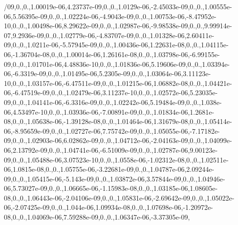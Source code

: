 \begin{DoxyCompactItemize}
/09,0.,0.,1.\-00019e-\/06,4.\-23737e-\/09,0.,0.,1.\-0129e-\/06,-\/2.\-45033e-\/09,0.,0.,1.\-00555e-\/06,5.\-56395e-\/09,0.,0.,1.\-02224e-\/06,-\/4.\-9043e-\/09,0.,0.,1.\-00753e-\/06,-\/8.\-47952e-\/10,0.,0.,1.\-00498e-\/06,8.\-29622e-\/09,0.,0.,1.\-02987e-\/06,-\/9.\-98538e-\/09,0.,0.,9.\-99914e-\/07,9.\-2936e-\/09,0.,0.,1.\-02779e-\/06,-\/4.\-83707e-\/09,0.,0.,1.\-01328e-\/06,2.\-60411e-\/09,0.,0.,1.\-0211e-\/06,-\/5.\-57945e-\/09,0.,0.,1.\-00436e-\/06,1.\-22631e-\/08,0.,0.,1.\-04115e-\/06,-\/1.\-36704e-\/08,0.,0.,1.\-00014e-\/06,1.\-26161e-\/08,0.,0.,1.\-03798e-\/06,-\/6.\-99155e-\/09,0.,0.,1.\-01701e-\/06,4.\-48836e-\/10,0.,0.,1.\-01836e-\/06,5.\-19606e-\/09,0.,0.,1.\-03394e-\/06,-\/6.\-3319e-\/09,0.,0.,1.\-01495e-\/06,5.\-2305e-\/09,0.,0.,1.\-03064e-\/06,3.\-11123e-\/10,0.,0.,1.\-03157e-\/06,-\/6.\-47511e-\/09,0.,0.,1.\-01215e-\/06,1.\-06882e-\/08,0.,0.,1.\-04421e-\/06,-\/6.\-47519e-\/09,0.,0.,1.\-02479e-\/06,3.\-11237e-\/10,0.,0.,1.\-02572e-\/06,5.\-23035e-\/09,0.,0.,1.\-04141e-\/06,-\/6.\-3316e-\/09,0.,0.,1.\-02242e-\/06,5.\-19484e-\/09,0.,0.,1.\-038e-\/06,4.\-53497e-\/10,0.,0.,1.\-03936e-\/06,-\/7.\-00891e-\/09,0.,0.,1.\-01834e-\/06,1.\-2681e-\/08,0.,0.,1.\-05638e-\/06,-\/1.\-39128e-\/08,0.,0.,1.\-01464e-\/06,1.\-31679e-\/08,0.,0.,1.\-05414e-\/06,-\/8.\-95659e-\/09,0.,0.,1.\-02727e-\/06,7.\-75742e-\/09,0.,0.,1.\-05055e-\/06,-\/7.\-17182e-\/09,0.,0.,1.\-02903e-\/06,6.\-02862e-\/09,0.,0.,1.\-04712e-\/06,-\/2.\-04163e-\/09,0.,0.,1.\-04099e-\/06,2.\-13792e-\/09,0.,0.,1.\-04741e-\/06,-\/6.\-51009e-\/09,0.,0.,1.\-02787e-\/06,9.\-00123e-\/09,0.,0.,1.\-05488e-\/06,3.\-07523e-\/10,0.,0.,1.\-0558e-\/06,-\/1.\-02312e-\/08,0.,0.,1.\-02511e-\/06,1.\-0815e-\/08,0.,0.,1.\-05755e-\/06,-\/3.\-22681e-\/09,0.,0.,1.\-04787e-\/06,2.\-09244e-\/09,0.,0.,1.\-05415e-\/06,-\/5.\-143e-\/09,0.,0.,1.\-03872e-\/06,3.\-57844e-\/09,0.,0.,1.\-04946e-\/06,5.\-73027e-\/09,0.,0.,1.\-06665e-\/06,-\/1.\-15983e-\/08,0.,0.,1.\-03185e-\/06,1.\-08605e-\/08,0.,0.,1.\-06443e-\/06,-\/2.\-04106e-\/09,0.,0.,1.\-05831e-\/06,-\/2.\-69642e-\/09,0.,0.,1.\-05022e-\/06,-\/2.\-07425e-\/09,0.,0.,1.\-044e-\/06,1.\-09934e-\/08,0.,0.,1.\-07698e-\/06,-\/1.\-20972e-\/08,0.,0.,1.\-04069e-\/06,7.\-59288e-\/09,0.,0.,1.\-06347e-\/06,-\/3.\-37305e-\/09,
\end{DoxyCompactItemize}
